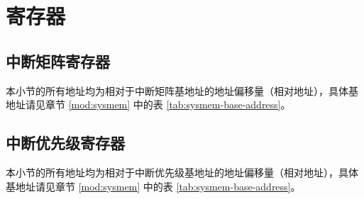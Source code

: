 \documentclass[main\_\_CN.tex]{subfiles}
\begin{document}


\clearpage
\section{寄存器}

\subsection{中断矩阵寄存器}

本小节的所有地址均为相对于中断矩阵基地址的地址偏移量（相对地址），具体基地址请见章节 \ref{mod:sysmem} \textit{} 中的表 \ref{tab:sysmem-base-address}。


\subsection{中断优先级寄存器}
\label{sec:intpri-reg}

本小节的所有地址均为相对于中断优先级基地址的地址偏移量（相对地址），具体基地址请见章节 \ref{mod:sysmem} \textit{} 中的表 \ref{tab:sysmem-base-address}。


\end{document}
